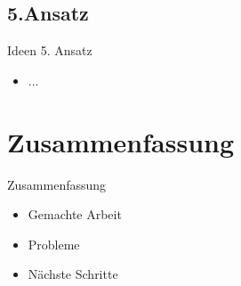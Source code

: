 \documentclass[aspectratio=169]{beamer} %
\begin{document}
\subsection{5.Ansatz}
\begin{frame}
  Ideen 5. Ansatz
  \begin{itemize}
    \item ...
  \end{itemize}
\end{frame}

\section{Zusammenfassung}
\begin{frame}
  Zusammenfassung
  \begin{itemize}
    \item Gemachte Arbeit
    \item Probleme
    \item N\"achste Schritte
  \end{itemize}
\end{frame}
\end{document}
